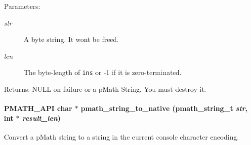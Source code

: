 \begin{Desc}
\item[Parameters:]
\begin{description}
\item[{\em str}]A byte string. It wont be freed. \item[{\em len}]The byte-length of {\tt ins} or -1 if it is zero-terminated. \end{description}
\end{Desc}
\begin{Desc}
\item[Returns:]NULL on failure or a pMath String. You must destroy it. \end{Desc}
\hypertarget{group__strings_g7ccade7efa65dc24f7cd573f15fc07e9}{
\paragraph[{pmath\_\-string\_\-to\_\-native}]{\setlength{\rightskip}{0pt plus 5cm}PMATH\_\-API char $\ast$ pmath\_\-string\_\-to\_\-native ({\bf pmath\_\-string\_\-t} {\em str}, \/  int $\ast$ {\em result\_\-len})}\hfill}
\label{group__strings_g7ccade7efa65dc24f7cd573f15fc07e9}


Convert a pMath string to a string in the current console character encoding. 

